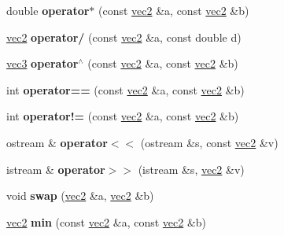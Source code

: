 \begin{DoxyCompactItemize}
\item 
\hypertarget{classvec2_aa314951155a7beba34cf29dd72e977d3}{
double {\bfseries operator$\ast$} (const \hyperlink{classvec2}{vec2} \&a, const \hyperlink{classvec2}{vec2} \&b)}
\label{classvec2_aa314951155a7beba34cf29dd72e977d3}

\item 
\hypertarget{classvec2_a4d3b74c580b975acf236c2b44b1a5199}{
\hyperlink{classvec2}{vec2} {\bfseries operator/} (const \hyperlink{classvec2}{vec2} \&a, const double d)}
\label{classvec2_a4d3b74c580b975acf236c2b44b1a5199}

\item 
\hypertarget{classvec2_aac6b3e1eec62f338713b46d70c63d7d3}{
\hyperlink{classvec3}{vec3} {\bfseries operator$^\wedge$} (const \hyperlink{classvec2}{vec2} \&a, const \hyperlink{classvec2}{vec2} \&b)}
\label{classvec2_aac6b3e1eec62f338713b46d70c63d7d3}

\item 
\hypertarget{classvec2_afdf120b1c31612eaba7789d6fda1d8c1}{
int {\bfseries operator==} (const \hyperlink{classvec2}{vec2} \&a, const \hyperlink{classvec2}{vec2} \&b)}
\label{classvec2_afdf120b1c31612eaba7789d6fda1d8c1}

\item 
\hypertarget{classvec2_aea40727983a519330d962da873e04c51}{
int {\bfseries operator!=} (const \hyperlink{classvec2}{vec2} \&a, const \hyperlink{classvec2}{vec2} \&b)}
\label{classvec2_aea40727983a519330d962da873e04c51}

\item 
\hypertarget{classvec2_a84022a88ca02adcbd0fb7099b42f5c77}{
ostream \& {\bfseries operator$<$$<$} (ostream \&s, const \hyperlink{classvec2}{vec2} \&v)}
\label{classvec2_a84022a88ca02adcbd0fb7099b42f5c77}

\item 
\hypertarget{classvec2_a7d8bfb226d3b2c0b9af5e365ab1bd952}{
istream \& {\bfseries operator$>$$>$} (istream \&s, \hyperlink{classvec2}{vec2} \&v)}
\label{classvec2_a7d8bfb226d3b2c0b9af5e365ab1bd952}

\item 
\hypertarget{classvec2_a9b33ecbc9fbb7e87fdbcef79dac05d2a}{
void {\bfseries swap} (\hyperlink{classvec2}{vec2} \&a, \hyperlink{classvec2}{vec2} \&b)}
\label{classvec2_a9b33ecbc9fbb7e87fdbcef79dac05d2a}

\item 
\hypertarget{classvec2_a7325208b2b73eef27f335b91f1d2f65b}{
\hyperlink{classvec2}{vec2} {\bfseries min} (const \hyperlink{classvec2}{vec2} \&a, const \hyperlink{classvec2}{vec2} \&b)}
\label{classvec2_a7325208b2b73eef27f335b91f1d2f65b}


\end{DoxyCompactItemize}
